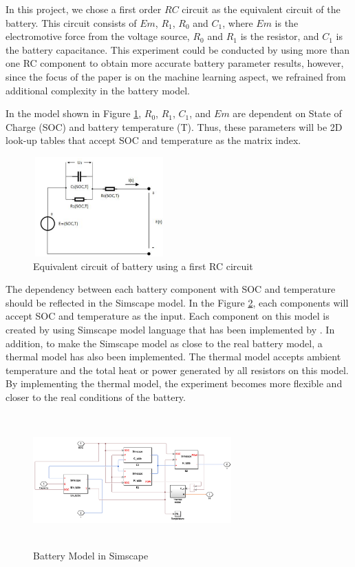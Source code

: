In this project, we chose a first order $RC$ circuit as the equivalent circuit of the battery. This circuit consists of $Em$, $R_1$, $R_0$ and $C_1$, where $Em$ is the electromotive force from the voltage source, $R_0$ and $R_1$ is the resistor, and $C_1$ is the battery capacitance. This experiment could be conducted by using more than one RC component to obtain more accurate battery parameter results, however, since the focus of the paper is on the machine learning aspect, we refrained from additional complexity in the battery model.



In the model shown in Figure \ref{fig:circuit_RC}, $R_0$, $R_1$, $C_1$, and $Em$ are dependent on State of Charge (SOC) and battery temperature (T). Thus, these parameters will be 2D look-up tables that accept SOC and temperature as the matrix index. 

\begin{figure}
 \includegraphics[height=1.5in, width=2in]{figures/Circuit_RC}
\caption{Equivalent circuit of battery using a first RC circuit}
\label{fig:circuit_RC}
\end{figure}



The dependency between each battery component with SOC and temperature should be reflected in the Simscape model. In the Figure \ref{fig:battery_model_sim}, each components will accept SOC and temperature as the input. Each component on this model is created by using Simscape model language that has been implemented by \MATLAB. In addition, to make the Simscape model as close to the real battery model, a thermal model has also been implemented. The thermal model accepts ambient temperature and the total heat or power generated by all resistors on this model. By implementing the thermal model, the experiment becomes more flexible and closer to the real conditions of the battery.

\begin{figure}
\includegraphics[height=2in, width=3in]{figures/BatteryModelSimscape}
\caption{Battery Model in Simscape}
\label{fig:battery_model_sim}
\end{figure}

